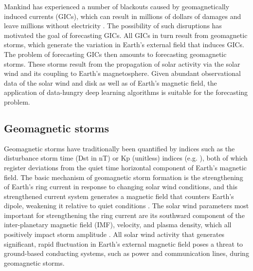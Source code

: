 Mankind has experienced a number of blackouts caused by geomagnetically induced currents (GICs), which can result in millions of dollars of damages and leave millions without electricity \citep{Bolduc2002, Love2018}. The possibility of such disruptions has motivated the goal of forecasting GICs. All GICs in turn result from geomagnetic storms, which generate the variation in Earth's external field that induces GICs. The problem of forecasting GICs then amounts to forecasting geomagnetic storms. These storms result from the propagation of solar activity via the solar wind and its coupling to Earth's magnetosphere. Given abundant observational data of the solar wind and disk as well as of Earth's magnetic field, the application of data-hungry deep learning algorithms is suitable for the forecasting problem.  


\subsection{Geomagnetic storms}\label{sec:SW}

Geomagnetic storms have traditionally been quantified by indices such as the disturbance storm time (Dst in nT) or Kp (unitless) indices (e.g. \cite{Bartels1939}), both of which register deviations from the quiet time horizontal component of Earth's magnetic field. The basic mechanism of geomagnetic storm formation is the strengthening of Earth's ring current in response to changing solar wind conditions, and this strengthened current system generates a magnetic field that counters Earth's dipole, weakening it relative to quiet conditions \citep{Daglis1999}. The solar wind parameters most important for strengthening the ring current are its southward component of the inter-planetary magnetic field (IMF), velocity, and plasma density, which all positively impact storm amplitude \citep{Wolf1997,Gonzalez1999,Daglis1999}. All solar wind activity that generates significant, rapid fluctuation in Earth's external magnetic field poses a threat to ground-based conducting systems, such as power and communication lines, during geomagnetic storms.


